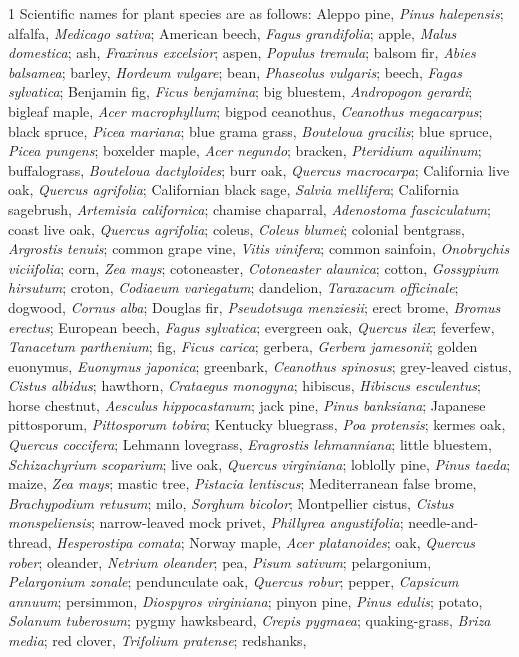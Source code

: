 \documentclass[10pt]{article}
\begin{document}
{\begin{ThreePartTable}
\begin{TableNotes}
\item{1} Scientific names for plant species are as follows: Aleppo pine, \textit{Pinus halepensis}; alfalfa, \textit{Medicago sativa}; American beech, \textit{Fagus grandifolia}; apple, \textit{Malus domestica}; ash, \textit{Fraxinus excelsior}; aspen, \textit{Populus tremula}; balsom fir, \textit{Abies balsamea}; barley, \textit{Hordeum vulgare}; bean, \textit{Phaseolus vulgaris}; beech, \textit{Fagas sylvatica}; Benjamin fig, \textit{Ficus benjamina}; big bluestem, \textit{Andropogon gerardi}; bigleaf maple, \textit{Acer macrophyllum}; bigpod ceanothus, \textit{Ceanothus megacarpus}; black spruce, \textit{Picea mariana}; blue grama grass, \textit{Bouteloua gracilis}; blue spruce, \textit{Picea pungens}; boxelder maple, \textit{Acer negundo}; bracken, \textit{Pteridium aquilinum}; buffalograss, \textit{Bouteloua dactyloides}; burr oak, \textit{Quercus macrocarpa}; California live oak, \textit{Quercus agrifolia}; Californian black sage, \textit{Salvia mellifera}; California sagebrush, \textit{Artemisia californica}; chamise chaparral, \textit{Adenostoma fasciculatum}; coast live oak, \textit{Quercus agrifolia}; coleus, \textit{Coleus blumei}; colonial bentgrass, \textit{Argrostis tenuis}; common grape vine, \textit{Vitis vinifera}; common sainfoin, \textit{Onobrychis viciifolia}; corn, \textit{Zea mays}; cotoneaster, \textit{Cotoneaster alaunica}; cotton, \textit{Gossypium hirsutum}; croton, \textit{Codiaeum variegatum}; dandelion, \textit{Taraxacum officinale}; dogwood, \textit{Cornus alba}; Douglas fir, \textit{Pseudotsuga menziesii}; erect brome, \textit{Bromus erectus}; European beech, \textit{Fagus sylvatica}; evergreen oak, \textit{Quercus ilex}; feverfew, \textit{Tanacetum parthenium}; fig, \textit{Ficus carica}; gerbera, \textit{Gerbera jamesonii}; golden euonymus, \textit{Euonymus japonica}; greenbark, \textit{Ceanothus spinosus}; grey-leaved cistus, \textit{Cistus albidus}; hawthorn, \textit{Crataegus monogyna}; hibiscus, \textit{Hibiscus esculentus}; horse chestnut, \textit{Aesculus hippocastanum}; jack pine, \textit{Pinus banksiana}; Japanese pittosporum, \textit{Pittosporum tobira}; Kentucky bluegrass, \textit{Poa protensis}; kermes oak, \textit{Quercus coccifera}; Lehmann lovegrass, \textit{Eragrostis lehmanniana}; little bluestem, \textit{Schizachyrium scoparium}; live oak, \textit{Quercus virginiana}; loblolly pine, \textit{Pinus taeda}; maize, \textit{Zea mays}; mastic tree, \textit{Pistacia lentiscus}; Mediterranean false brome, \textit{Brachypodium retusum}; milo, \textit{Sorghum bicolor}; Montpellier cistus, \textit{Cistus monspeliensis}; narrow-leaved mock privet, \textit{Phillyrea angustifolia}; needle-and-thread, \textit{Hesperostipa comata}; Norway maple, \textit{Acer platanoides}; oak, \textit{Quercus rober}; oleander, \textit{Netrium oleander}; pea, \textit{Pisum sativum}; pelargonium, \textit{Pelargonium zonale}; pendunculate oak, \textit{Quercus robur}; pepper, \textit{Capsicum annuum}; persimmon, \textit{Diospyros virginiana}; pinyon pine, \textit{Pinus edulis}; potato, \textit{Solanum tuberosum}; pygmy hawksbeard, \textit{Crepis pygmaea}; quaking-grass, \textit{Briza media}; red clover, \textit{Trifolium pratense}; redshanks, 
\end{TableNotes}
\end{ThreePartTable}}
\end{document}

